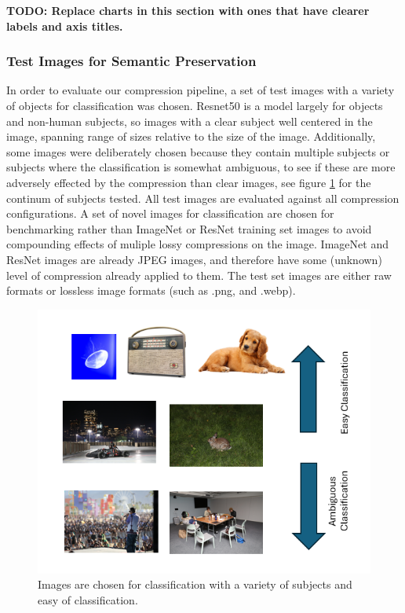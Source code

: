 \textbf{TODO: Replace charts in this section with ones that have clearer labels and axis titles.}

\subsubsection{Test Images for Semantic Preservation}

In order to evaluate our compression pipeline, a set of test images with a variety of objects for classification was chosen. 
Resnet50 is a model largely for objects and non-human subjects, so images with a clear subject well centered in the image, spanning range of sizes relative to the size of the image. 
Additionally, some images were deliberately chosen because they contain multiple subjects or subjects where the classification is somewhat ambiguous, to see if these are more adversely effected by the compression than clear images, see figure \ref{fig:test_images} for the continum of subjects tested. 
All test images are evaluated against all compression configurations. A set of novel images for classification are chosen for benchmarking rather than ImageNet or ResNet training set images to avoid compounding effects of muliple lossy compressions on the image. 
ImageNet and ResNet images are already JPEG images, and therefore have some (unknown) level of compression already applied to them. The test set images are either raw formats or lossless image formats (such as .png, and .webp).

\begin{figure}
    \includegraphics{assets/Classification Sweep.png}
    \caption{Images are chosen for classification with a variety of subjects and easy of classification.}
    \label{fig:test_images}
\end{figure}


